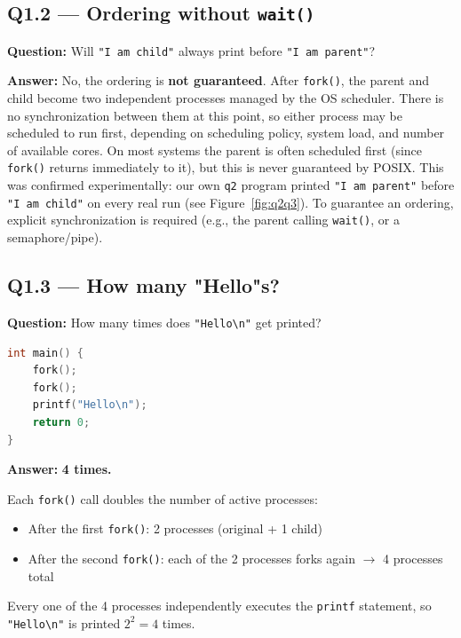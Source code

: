 \documentclass[12pt,a4paper]{article}
\begin{document}
\subsection*{Q1.2 --- Ordering without \texttt{wait()}}

\textbf{Question:} Will \texttt{"I am child"} always print before \texttt{"I am parent"}?

\textbf{Answer:} No, the ordering is \textbf{not guaranteed}. After \texttt{fork()}, the parent
and child become two independent processes managed by the OS scheduler. There is no
synchronization between them at this point, so either process may be scheduled to run
first, depending on scheduling policy, system load, and number of available cores.
On most systems the parent is often scheduled first (since \texttt{fork()} returns
immediately to it), but this is never guaranteed by POSIX. This was confirmed
experimentally: our own \texttt{q2} program printed \texttt{"I am parent"} before
\texttt{"I am child"} on every real run (see Figure~\ref{fig:q2q3}). To guarantee an
ordering, explicit synchronization is required (e.g., the parent calling \texttt{wait()},
or a semaphore/pipe).

\subsection*{Q1.3 --- How many "Hello"s?}

\textbf{Question:} How many times does \texttt{"Hello\textbackslash n"} get printed?

\begin{lstlisting}[language=C]
int main() {
    fork();
    fork();
    printf("Hello\n");
    return 0;
}
\end{lstlisting}

\textbf{Answer:} \textbf{4 times.}

Each \texttt{fork()} call doubles the number of active processes:
\begin{itemize}
    \item After the first \texttt{fork()}: 2 processes (original + 1 child)
    \item After the second \texttt{fork()}: each of the 2 processes forks again $\rightarrow$ 4 processes total
\end{itemize}
Every one of the 4 processes independently executes the \texttt{printf} statement, so
\texttt{"Hello\textbackslash n"} is printed $2^2 = 4$ times.

\newpage
\end{document}
